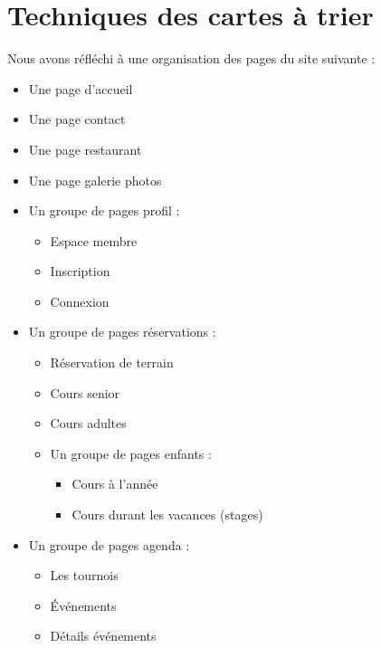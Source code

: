 \documentclass{article}[12pt]
\begin{document}
\section{Techniques des cartes à trier}
\begin{figure}[H]
	\centering   {}
\end{figure}
Nous avons réfléchi à une organisation des pages du site suivante :
\begin{itemize}
	\item Une page d'accueil
    \item Une page contact
    \item Une page restaurant
    \item Une page galerie photos
    \item Un groupe de pages profil :
    \begin{itemize}
    	\item Espace membre
        \item Inscription
        \item Connexion
    \end{itemize}
    \item Un groupe de pages réservations :
    \begin{itemize}
    	\item Réservation de terrain
        \item Cours senior
        \item Cours adultes
        \item Un groupe de pages enfants :
        \begin{itemize}
          \item  Cours à l'année
          \item Cours durant les vacances (stages)
   		\end{itemize}
        
    \end{itemize}
    \item Un groupe de pages agenda :
    \begin{itemize}
          \item  Les tournois
          \item Événements
          \item Détails événements
   	\end{itemize}
    
    
\end{itemize}
\newpage
\end{document}
